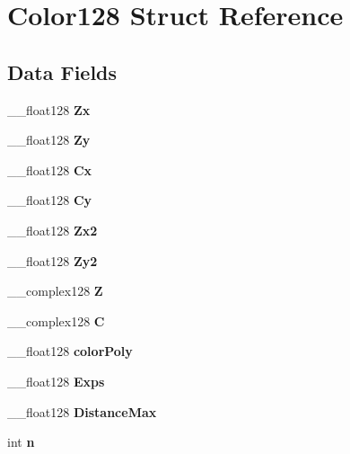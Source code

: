 \hypertarget{struct_color128}{}\section{Color128 Struct Reference}
\label{struct_color128}
\subsection*{Data Fields}
\begin{DoxyCompactItemize}
\item 
\mbox{\label{struct_color128_a1b9594bb49e14fb65892cb73b76cfdad}} 
\+\_\+\+\_\+float128 {\bfseries Zx}
\item 
\mbox{\label{struct_color128_a7fc499c167fb236d20ad9b2e6052b4b3}} 
\+\_\+\+\_\+float128 {\bfseries Zy}
\item 
\mbox{\label{struct_color128_a9c7a57c32aa6d05bac44b977d83261b2}} 
\+\_\+\+\_\+float128 {\bfseries Cx}
\item 
\mbox{\label{struct_color128_ac7bd2873d9dcc9496c30762846e9357a}} 
\+\_\+\+\_\+float128 {\bfseries Cy}
\item 
\mbox{\label{struct_color128_a332d99cef1756df3cd4fa6623a97599b}} 
\+\_\+\+\_\+float128 {\bfseries Zx2}
\item 
\mbox{\label{struct_color128_a8f397bfacccdd7f7c4b62de261960426}} 
\+\_\+\+\_\+float128 {\bfseries Zy2}
\item 
\mbox{\label{struct_color128_acffc1997afccd231603ea5af55ddf900}} 
\+\_\+\+\_\+complex128 {\bfseries Z}
\item 
\mbox{\label{struct_color128_a7d8d0e07afcc033267f5c6b8ee5460af}} 
\+\_\+\+\_\+complex128 {\bfseries C}
\item 
\mbox{\label{struct_color128_aad976108c20d5dac944813afb39e1b39}} 
\+\_\+\+\_\+float128 {\bfseries color\+Poly}
\item 
\mbox{\label{struct_color128_a3895ee8a70d847ed619c50b24c8302d1}} 
\+\_\+\+\_\+float128 {\bfseries Exps}
\item 
\mbox{\label{struct_color128_ad5c9016be1b1895979d83fb0cf6b59b5}} 
\+\_\+\+\_\+float128 {\bfseries Distance\+Max}
\item 
\mbox{\label{struct_color128_a75ba840a2e2fa86970dbbe43b2a6acff}} 
int {\bfseries n}
\end{DoxyCompactItemize}


